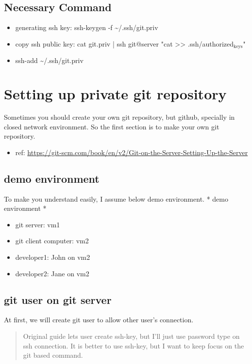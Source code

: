 \documentclass[bigger]{beamer}
\begin{document}
\subsection{Necessary Command}
\label{sec:orgheadline1}
\begin{itemize}
\item generating ssh key: ssh-keygen -f \textasciitilde{}/.ssh/git.priv
\item copy ssh public key: cat git.priv | ssh git@server "cat >> .ssh/authorized\(_{\text{keys}}\)"
\item ssh-add \textasciitilde{}/.ssh/git.priv
\end{itemize}

\section{Setting up private git repository}
\label{sec:orgheadline1}
Sometimes you should create your own git repository, but github, specially in closed network environment.
So the first section is to make your own git repository.
\begin{itemize}
\item ref: \url{https://git-scm.com/book/en/v2/Git-on-the-Server-Setting-Up-the-Server}
\end{itemize}

\subsection{demo environment}
\label{sec:orgheadline1}
To make you understand easily, I assume below demo environment.
  \alert{* demo environment *}
\begin{itemize}
\item git server: vm1
\item git client computer: vm2
\item developer1: John on vm2
\item developer2: Jane on vm2
\end{itemize}

\subsection{git user on git server}
\label{sec:orgheadline1}
At first, we will create git user to allow other user's connection.
\begin{quote}
Original guide lets user create ssh-key, but I'll just use password type on ssh connection.
It is better to use ssh-key, but I want to keep focus on the git based command.  
\end{quote}
\end{document}
